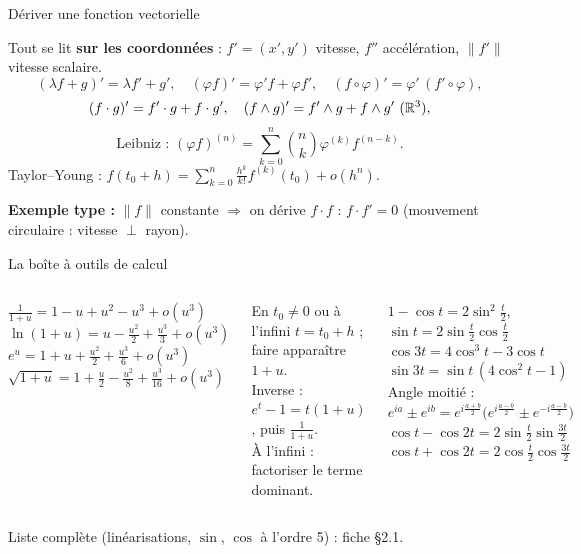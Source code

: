 \documentclass[aspectratio=169,11pt]{beamer}
\begin{document}
\begin{frame}{Dériver une fonction vectorielle}
\begin{FORM}[Dérivation]
Tout se lit \textbf{sur les coordonnées} : $f'=(x',y')$ vitesse, $f''$ accélération, $\|f'\|$ vitesse scalaire.
\[(\lambda f+g)'=\lambda f'+g',\quad(\varphi f)'=\varphi'f+\varphi f',\quad(f\circ\varphi)'=\varphi'\,(f'\circ\varphi),\]
\[(f\cdot g)'=f'\cdot g+f\cdot g',\quad(f\wedge g)'=f'\wedge g+f\wedge g'\ (\mathbb{R}^3),\]
\[\text{Leibniz : }(\varphi f)^{(n)}=\textstyle\sum_{k=0}^n\binom nk\varphi^{(k)}f^{(n-k)}.\]
Taylor--Young : $f(t_0+h)=\sum_{k=0}^n\frac{h^k}{k!}f^{(k)}(t_0)+o(h^n)$.
\end{FORM}
\pause
\textbf{Exemple type :} $\|f\|$ constante $\Rightarrow$ on dérive $f\cdot f$ : $f\cdot f'=0$ (mouvement circulaire : vitesse $\perp$ rayon).
\end{frame}

\begin{frame}{La boîte à outils de calcul}
\begin{columns}[T]
\begin{FORM}[DL en 0]
$\frac1{1+u}=1-u+u^2-u^3+o(u^3)$\\[2pt]
$\ln(1+u)=u-\frac{u^2}2+\frac{u^3}3+o(u^3)$\\[2pt]
$e^u=1+u+\frac{u^2}2+\frac{u^3}6+o(u^3)$\\[2pt]
$\sqrt{1+u}=1+\frac u2-\frac{u^2}8+\frac{u^3}{16}+o(u^3)$
\end{FORM}
\begin{METH}{En $t_0\neq0$ ou à l'infini}
$t=t_0+h$ ; faire apparaître $1+u$.\\
Inverse : $e^t-1=t(1+u)$, puis $\frac1{1+u}$.\\
À l'infini : factoriser le terme dominant.
\end{METH}
\begin{FORM}[Trigonométrie]
$1-\cos t=2\sin^2\frac t2$,\ \ $\sin t=2\sin\frac t2\cos\frac t2$\\[2pt]
$\cos3t=4\cos^3t-3\cos t$\\[2pt]
$\sin3t=\sin t\,(4\cos^2t-1)$\\[2pt]
Angle moitié :\\
$e^{ia}\pm e^{ib}=e^{i\frac{a+b}2}\big(e^{i\frac{a-b}2}\pm e^{-i\frac{a-b}2}\big)$\\[2pt]
$\cos t-\cos2t=2\sin\frac t2\sin\frac{3t}2$\\[2pt]
$\cos t+\cos2t=2\cos\frac t2\cos\frac{3t}2$
\end{FORM}
\end{columns}
{\footnotesize\color{Gris}Liste complète (linéarisations, $\sin$, $\cos$ à l'ordre 5) : fiche §2.1.}
\end{frame}
\end{document}
